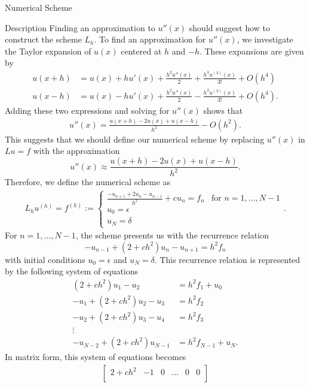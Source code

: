 \documentclass{article}
\begin{document}
\begin{section}{Numerical Scheme}
\begin{subsection}{Description}
    Finding an approximation to $u''(x)$ should suggest how to construct
    the scheme $L_h$.
    To find an approximation for $u''(x)$, we investigate the Taylor expansion
    of $u(x)$ centered at $h$ and $-h$. These expansions are given by
    \begin{align*}
      u(x + h) &= u(x) + h u'(x) + \frac{h^2 u ''(x)}{2} + \frac{h^3 u^{(3)}(x)}{3!} + O(h^4) \\
      u(x - h) &= u(x) - h u'(x) + \frac{h^2 u ''(x)}{2} - \frac{h^3 u^{(3)}(x)}{3!} + O(h^4).
    \end{align*}
    Adding these two expressions and solving for $u''(x)$ shows that
    \begin{align}\label{second_deriv}
      u''(x) = \frac{u(x + h) - 2u(x) + u(x-h)}{h^2} - O(h^2).
    \end{align}
    This suggests that we should define our numerical scheme by replacing $u''(x)$
    in $Lu = f$ with the approximation
    \[
      u''(x) \approx \frac{u(x + h) - 2u(x) + u(x-h)}{h^2}.
    \]
    Therefore, we define the numerical scheme as
    \begin{align*}
      L_h u^{(h)} = f^{(h)} :=
      \begin{cases}
        \frac{-u_{n+1} + 2 u_n - u_{n-1}}{h^2} + c u_n = f_n & \text{for $n= 1, \dots, N - 1$} \\
        u_0 = \epsilon \\
        u_N = \delta
      \end{cases}.
    \end{align*}
    For $n=1,\dots,N-1$, the scheme presents us with the recurrence relation
    \[
      -u_{n-1} + (2 + ch^2) u_n - u_{n+1} = h^2 f_n
    \]
    with initial conditions $u_0 = \epsilon$ and $u_N = \delta$. This recurrence
    relation is represented by the following system of equations
    \begin{align*}
      (2 + ch^2) u_1 - u_2 &= h^2f_1 + u_0 \\
      -u_1 + (2 + ch^2) u_2 - u_3 &= h^2f_2 \\
      -u_2 + (2 + ch^2) u_3 - u_4 &= h^2f_3 \\
      \vdots &  \\
      -u_{N-2} + (2 + ch^2) u_{N-1} &= h^2f_{N-1} + u_N.
    \end{align*}
    In matrix form, this system of equations becomes
    \begin{align*}
      \begin{bmatrix}
        2 + ch^2 & -1 & 0 & \hdots & 0 & 0\\

\end{bmatrix}
\end{align*}
\end{subsection}
\end{section}
\end{document}
